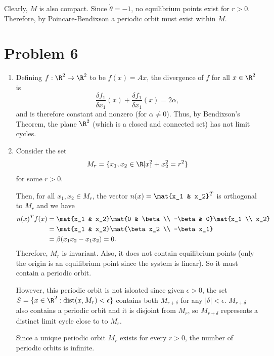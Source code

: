 \documentclass{homework}
\begin{document}
\begin{letterenum}
Clearly, $M$ is also compact. Since $\dot{\theta} = -1$, no equilibrium points
exist for $r>0$. Therefore, by Poincare-Bendixson a periodic orbit must exist
within $M$.

\section{Problem 6}
\begin{enumerate}
\item Defining $f: \R^2 \to \R^2$ to be $f(x) = Ax$, the divergence of $f$
for all $x \in \R^2$ is
\begin{equation*}
    \frac{\delta f_1}{\delta x_1}(x) + \frac{\delta f_1}{\delta x_1}(x) = 2\alpha,
\end{equation*}
and is therefore constant and nonzero (for $\alpha \neq 0$). Thus, by
Bendixson's Theorem, the plane $\R^2$ (which is a closed and connected set)
has not limit cycles.

\item Consider the set
\begin{equation*}
    M_r = \{x_1, x_2 \in \R| x_1^2 + x_2^2 = r^2\}
\end{equation*}
for some $r>0$.

Then, for all $x_1,x_2\in M_r$, the vector $n(x) = \mat{x_1 & x_2}^T$ is orthogonal
to $M_r$ and we have
\begin{align*}
    n(x)^T f(x) &= \mat{x_1 & x_2} \mat{0 & \beta \\ -\beta & 0} \mat{x_1 \\ x_2} \\
        &= \mat{x_1 & x_2} \mat{\beta x_2 \\ -\beta x_1} \\
        &= \beta(x_1 x_2 - x_1 x_2) = 0.
\end{align*}
Therefore, $M_r$ is invariant. Also, it does not contain equilibrium points
(only the origin is an equilibrium point since the system is linear).
So it must contain a periodic orbit.

However, this periodic orbit is not isloated since given $\epsilon > 0$,
the set $S = \{x\in\R^2: \text{dist}(x, M_r) < \epsilon\}$ contains
both $M_{r+\delta}$ for any $|\delta| < \epsilon$.
$M_{r+\delta}$ also contains a periodic orbit and it is disjoint
from $M_r$, so $M_{r+\delta}$ represents a distinct limit cycle close to
to $M_r$.

Since a unique periodic orbit $M_r$ exists for every $r>0$, the
number of periodic orbits is infinite.

\end{enumerate}


\end{letterenum}
\end{document}
